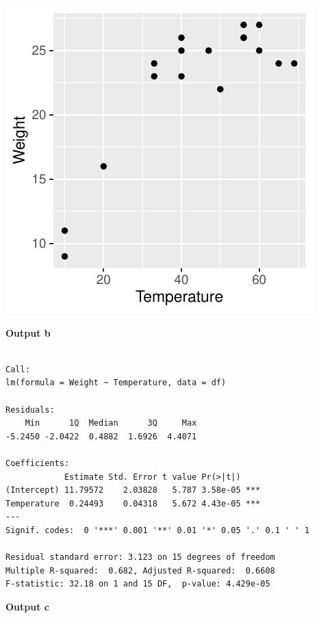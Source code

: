 \documentclass[]{article}
\begin{document}
\includegraphics{modelquestions_files/figure-latex/unnamed-chunk-2-1.pdf}

\textbf{Output b}

\begin{verbatim}

Call:
lm(formula = Weight ~ Temperature, data = df)

Residuals:
    Min      1Q  Median      3Q     Max 
-5.2450 -2.0422  0.4882  1.6926  4.4071 

Coefficients:
            Estimate Std. Error t value Pr(>|t|)    
(Intercept) 11.79572    2.03828   5.787 3.58e-05 ***
Temperature  0.24493    0.04318   5.672 4.43e-05 ***
---
Signif. codes:  0 '***' 0.001 '**' 0.01 '*' 0.05 '.' 0.1 ' ' 1

Residual standard error: 3.123 on 15 degrees of freedom
Multiple R-squared:  0.682, Adjusted R-squared:  0.6608 
F-statistic: 32.18 on 1 and 15 DF,  p-value: 4.429e-05
\end{verbatim}

\textbf{Output c}
\end{document}
